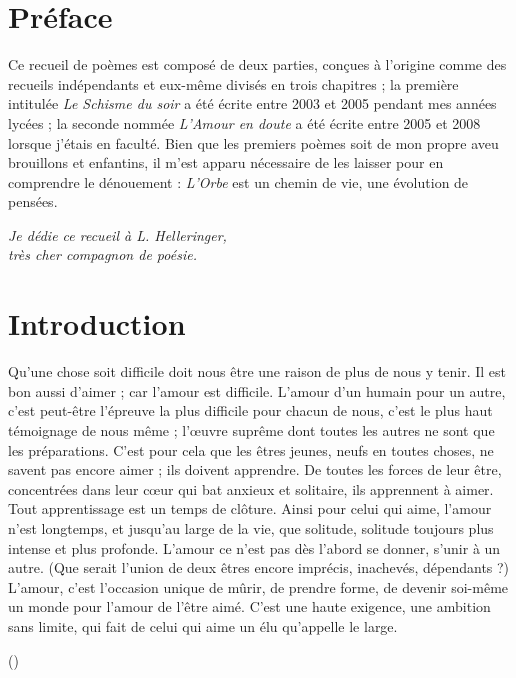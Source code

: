 \chapter*{Préface}
Ce recueil de poèmes est composé de deux parties, conçues à l'origine comme des recueils indépendants et eux-même divisés en trois chapitres ; la première intitulée \emph{Le Schisme du soir} a été écrite entre 2003 et 2005 pendant mes années lycées ; la seconde nommée \emph{L'Amour en doute} a été écrite entre 2005 et 2008 lorsque j'étais en faculté. Bien que les premiers poèmes soit de mon propre aveu brouillons et enfantins, il m'est apparu nécessaire de les laisser pour en comprendre le dénouement : \emph{L'Orbe} est un chemin de vie, une évolution de pensées. %

\vfill
\begin{flushright}
\emph{Je dédie ce recueil à L. Helleringer,\\
très cher compagnon de poésie.}
\end{flushright}


\chapter*{Introduction}
Qu'une chose soit difficile doit nous être une raison de plus de nous y tenir. Il est bon aussi d'aimer ; car l'amour est difficile. L'amour d'un humain pour un autre, c'est peut-être l'épreuve la plus difficile pour chacun de nous, c'est le plus haut témoignage de nous même ; l'œuvre suprême dont toutes les autres ne sont que les préparations. C'est pour cela que les êtres jeunes, neufs en toutes choses, ne savent pas encore aimer ; ils doivent apprendre. De toutes les forces de leur être, concentrées dans leur cœur qui bat anxieux et solitaire, ils apprennent à aimer. Tout apprentissage est un temps de clôture. Ainsi pour celui qui aime, l'amour n'est longtemps, et jusqu'au large de la vie, que solitude, solitude toujours plus intense et plus profonde. L'amour ce n'est pas dès l'abord se donner, s'unir à un autre. (Que serait l'union de deux êtres encore imprécis, inachevés, dépendants ?) L'amour, c'est l'occasion unique de mûrir, de prendre forme, de devenir soi-même un monde pour l'amour de l'être aimé. C'est une haute exigence, une ambition sans limite, qui fait de celui qui aime un élu qu'appelle le large.
\begin{flushright}
()
\end{flushright}